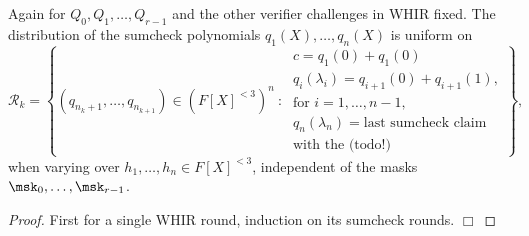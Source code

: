 \begin{lem}
Again for $Q_0, Q_1,\ldots, Q_{r-1}$ and the other verifier challenges in WHIR fixed.
The distribution of the sumcheck polynomials 
$q_1(X),\ldots, q_n(X)$ is uniform on 
\[
\mathcal R_k = 
\left\{
(q_{n_k+1},\ldots, q_{n_{k+1}})\in \left(F[X]^{<3}\right)^n \::\:
\begin{matrix}
c = q_1(0) + q_1(0)
\\
q_i(\lambda_i) = q_{i+1}(0) + q_{i+1}(1),
\\
\text{for }i=1,\ldots,n-1,
\\
q_n(\lambda_n) = \text{last sumcheck claim} 
\\
\text{with the (todo!)}
\end{matrix}
\right\},
\]
when varying over $h_1,\ldots, h_n\in F[X]^{<3}$, independent of the masks $\msk_0,\ldots,\msk_{r-1}$. 
\end{lem}

\begin{proof}
First for a single WHIR round, induction on its sumcheck rounds.
$\Box$
\end{proof}
